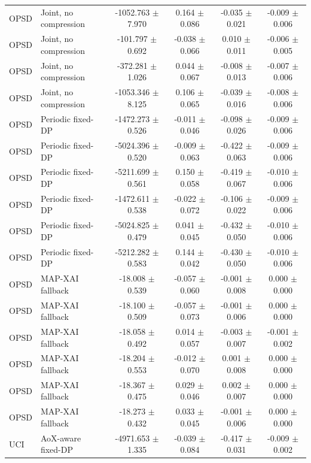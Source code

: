 \begin{table}[t]
\begin{tabular}{llcccc}
OPSD & Joint, no compression & -1052.763 $\pm$ 7.970 & 0.164 $\pm$ 0.086 & -0.035 $\pm$ 0.021 & -0.009 $\pm$ 0.006 \\
OPSD & Joint, no compression & -101.797 $\pm$ 0.692 & -0.038 $\pm$ 0.066 & 0.010 $\pm$ 0.011 & -0.006 $\pm$ 0.005 \\
OPSD & Joint, no compression & -372.281 $\pm$ 1.026 & 0.044 $\pm$ 0.067 & -0.008 $\pm$ 0.013 & -0.007 $\pm$ 0.006 \\
OPSD & Joint, no compression & -1053.346 $\pm$ 8.125 & 0.106 $\pm$ 0.065 & -0.039 $\pm$ 0.016 & -0.008 $\pm$ 0.006 \\
OPSD & Periodic fixed-DP & -1472.273 $\pm$ 0.526 & -0.011 $\pm$ 0.046 & -0.098 $\pm$ 0.026 & -0.009 $\pm$ 0.006 \\
OPSD & Periodic fixed-DP & -5024.396 $\pm$ 0.520 & -0.009 $\pm$ 0.063 & -0.422 $\pm$ 0.063 & -0.009 $\pm$ 0.006 \\
OPSD & Periodic fixed-DP & -5211.699 $\pm$ 0.561 & 0.150 $\pm$ 0.058 & -0.419 $\pm$ 0.067 & -0.010 $\pm$ 0.006 \\
OPSD & Periodic fixed-DP & -1472.611 $\pm$ 0.538 & -0.022 $\pm$ 0.072 & -0.106 $\pm$ 0.022 & -0.009 $\pm$ 0.006 \\
OPSD & Periodic fixed-DP & -5024.825 $\pm$ 0.479 & 0.041 $\pm$ 0.045 & -0.432 $\pm$ 0.050 & -0.010 $\pm$ 0.006 \\
OPSD & Periodic fixed-DP & -5212.282 $\pm$ 0.583 & 0.144 $\pm$ 0.042 & -0.430 $\pm$ 0.050 & -0.010 $\pm$ 0.006 \\
OPSD & MAP-XAI fallback & -18.008 $\pm$ 0.539 & -0.057 $\pm$ 0.060 & -0.001 $\pm$ 0.008 & 0.000 $\pm$ 0.000 \\
OPSD & MAP-XAI fallback & -18.100 $\pm$ 0.509 & -0.057 $\pm$ 0.073 & -0.001 $\pm$ 0.006 & 0.000 $\pm$ 0.000 \\
OPSD & MAP-XAI fallback & -18.058 $\pm$ 0.492 & 0.014 $\pm$ 0.057 & -0.003 $\pm$ 0.007 & -0.001 $\pm$ 0.002 \\
OPSD & MAP-XAI fallback & -18.204 $\pm$ 0.553 & -0.012 $\pm$ 0.070 & 0.001 $\pm$ 0.008 & 0.000 $\pm$ 0.000 \\
OPSD & MAP-XAI fallback & -18.367 $\pm$ 0.475 & 0.029 $\pm$ 0.046 & 0.002 $\pm$ 0.007 & 0.000 $\pm$ 0.000 \\
OPSD & MAP-XAI fallback & -18.273 $\pm$ 0.432 & 0.033 $\pm$ 0.045 & -0.001 $\pm$ 0.006 & 0.000 $\pm$ 0.000 \\
UCI & AoX-aware fixed-DP & -4971.653 $\pm$ 1.335 & -0.039 $\pm$ 0.084 & -0.417 $\pm$ 0.031 & -0.009 $\pm$ 0.002 \\

\end{tabular}
\end{table}
